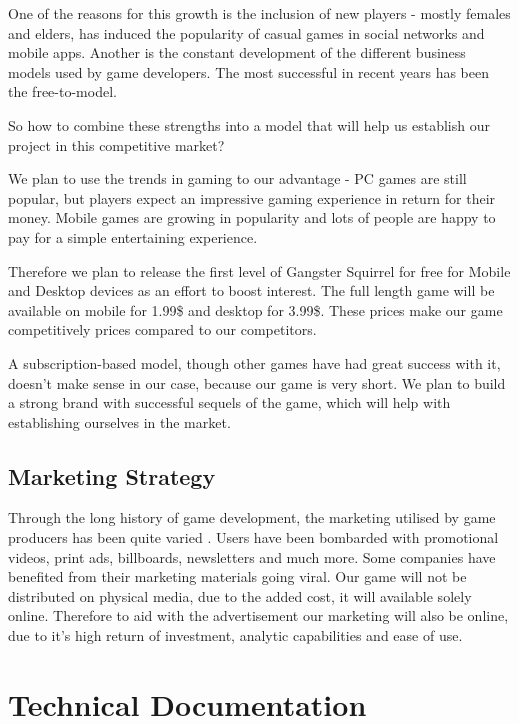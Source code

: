 \documentclass[12p]{article}
\begin{document}
One of the reasons for this growth is the inclusion of new players - mostly females and elders, has induced the popularity of casual games in social networks and mobile apps. Another is the constant development of the different business models used by game developers. The most successful in recent years has been the free-to-model.\cite{BusinessModelsAndStrategy}

So how to combine these strengths into a model that will help us establish our project in this competitive market?

We plan to use the trends in gaming to our advantage - PC games are still popular, but players expect an impressive gaming experience in return for their money. Mobile games are growing in popularity and lots of people are happy to pay for a simple entertaining experience.

Therefore we plan to release the first level of Gangster Squirrel for free for Mobile and Desktop devices as an effort to boost interest. The full length game will be available on mobile for 1.99\$ and desktop for 3.99\$. These prices make our game competitively prices compared to our competitors.

A subscription-based model, though other games have had great success with it, doesn’t make sense in our case, because our game is very short. We plan to build a strong brand with successful sequels of the game, which will help with establishing ourselves in the market.

\subsection{Marketing Strategy}
Through the long history of game development, the marketing utilised by game producers has been quite varied \cite{MarketingStrategyExamples}. Users have been bombarded with promotional videos, print ads, billboards, newsletters and much more. Some companies have benefited from their marketing materials going viral.
Our game will not be distributed on physical media, due to the added cost, it will available solely online. Therefore to aid with the advertisement our marketing will also be online, due to it's high return of investment, analytic capabilities and ease of use.


\newpage
\section{Technical Documentation}
\end{document}
